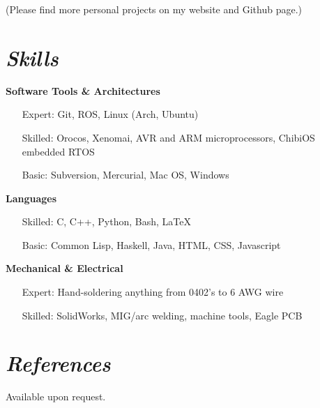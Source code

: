 \documentclass[10pt,letterpaper,margin]{res}
\begin{document}
\begin{resume}
{\footnotesize (Please find more personal projects on my website and Github page.)}



\section{\large\itshape Skills}

{\bf Software Tools \& Architectures}\vspace{0.2em}

\begin{itemize}
	\setlength{\itemindent}{3em}
	\item[Expert:] Git, ROS, Linux (Arch, Ubuntu)
	\item[Skilled:] Orocos, Xenomai, AVR and ARM microprocessors, ChibiOS
		embedded RTOS
	\item[Basic:] Subversion, Mercurial, Mac OS, Windows
\end{itemize}

{\bf Languages}\vspace{0.2em}

\begin{itemize}
	\setlength{\itemindent}{3em}
	\item[Skilled:] C, C++, Python, Bash, \LaTeX
	\item[Basic:] Common Lisp, Haskell, Java, HTML, CSS, Javascript
\end{itemize}

{\bf Mechanical \& Electrical}\vspace{0.2em}

\begin{itemize}
	\setlength{\itemindent}{3em}
	\item[Expert:] Hand-soldering anything from 0402's to 6 AWG wire
	\item[Skilled:] SolidWorks, MIG/arc welding, machine tools, Eagle PCB
\end{itemize}



\section{\large\itshape References}

Available upon request.

\end{resume}
\end{document}
